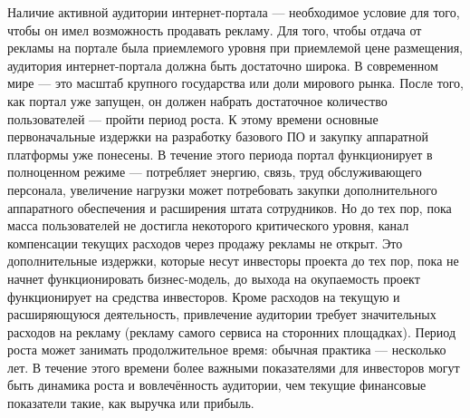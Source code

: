 \documentclass{article}
\begin{document}
Наличие активной аудитории интернет-портала — необходимое условие для того, чтобы он имел возможность продавать рекламу. Для того, чтобы отдача от рекламы на портале была приемлемого уровня при приемлемой цене размещения, аудитория интернет-портала должна быть достаточно широка. В современном мире — это масштаб крупного государства или доли мирового рынка. После того, как портал уже запущен, он должен набрать достаточное количество пользователей — пройти период роста. К этому времени основные первоначальные издержки на разработку базового ПО и закупку аппаратной платформы уже понесены. В течение этого периода портал функционирует в полноценном режиме — потребляет энергию, связь, труд обслуживающего персонала, увеличение нагрузки может потребовать закупки дополнительного аппаратного обеспечения и расширения штата сотрудников. Но до тех пор, пока масса пользователей не достигла некоторого критического уровня, канал компенсации текущих расходов через продажу рекламы не открыт. Это дополнительные издержки, которые несут инвесторы проекта до тех пор, пока не начнет функционировать бизнес-модель, до выхода на окупаемость проект функционирует на средства инвесторов. Кроме расходов на текущую и расширяющуюся деятельность, привлечение аудитории требует значительных расходов на рекламу (рекламу самого сервиса на сторонних площадках). Период роста может занимать продолжительное время: обычная практика — несколько лет. В течение этого времени более важными показателями для инвесторов могут быть динамика роста и вовлечённость аудитории, чем текущие финансовые показатели такие, как выручка или прибыль.
\end{document}
